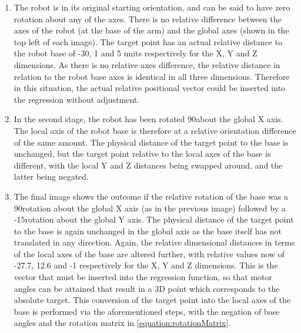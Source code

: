 \documentclass[11pt]{article}
\begin{document}
\begin{enumerate}
\item{The robot is in its original starting orientation, and can be said to have zero rotation about any of the axes. There is no relative difference between the axes of the robot (at the base of the arm) and the global axes (shown in the top left of each image). The target point has an actual relative distance to the robot base of -30, 1 and 5 units respectively for the X, Y and Z dimensions. As there is no relative axes difference, the relative distance in relation to the robot base axes is identical in all three dimensions. Therefore in this situation, the actual relative positional vector could be inserted into the regression without adjustment.}

\item{In the second stage, the robot has been rotated 90\degree about the global X axis. The local axis of the robot base is therefore at a relative orientation difference of the same amount. The physical distance of the target point to the base is unchanged, but the target point relative to the local axes of the base is different, with the local Y and Z distances being swapped around, and the latter being negated.}

\item{The final image shows the outcome if the relative rotation of the base was a 90\degree rotation about the global X axis (as in the previous image) followed by a -15\degree rotation about the global Y axis. The physical distance of the target point to the base is again unchanged in the global axis as the base itself has not translated in any direction. Again, the relative dimensional distances in terms of the local axes of the base are altered further, with relative values now of -27.7, 12.6 and -1 respectively for the X, Y and Z dimensions. This is the vector that must be inserted into the regression function, so that motor angles can be attained that result in a 3D point which corresponds to the absolute target. This conversion of the target point into the local axes of the base is performed via the aforementioned steps, with the negation of base angles and the rotation matrix in \ref{equation:rotationMatrix}}.
\end{enumerate}
\end{document}
